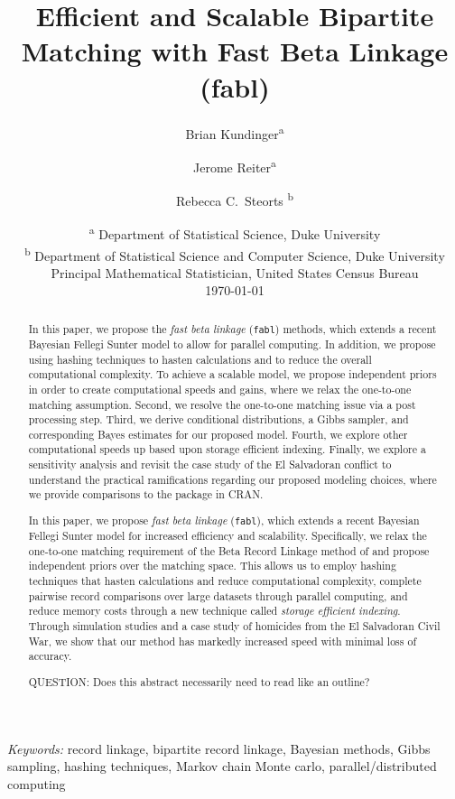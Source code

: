 \documentclass[12pt,letterpaper]{article}
\title{Efficient and Scalable Bipartite Matching with Fast Beta Linkage  (fabl)}
\author{Brian Kundinger\textsuperscript{a} \and
  Jerome Reiter\textsuperscript{a} \and 
  Rebecca C.~Steorts \textsuperscript{b}}
\date{
 \textsuperscript{a} Department of Statistical Science, Duke University \\
 \textsuperscript{b} Department of Statistical Science and Computer Science, Duke University\\Principal Mathematical Statistician, United States Census Bureau\\[2ex]
  \today}
\newcommand{\1}[1]{\mathbb{I}\!\left[#1\right]} %
\begin{document}
\maketitle

\bigskip
\begin{abstract}
In this paper, we propose the \emph{fast beta linkage} (\texttt{fabl}) methods, which extends a recent Bayesian Fellegi Sunter model to allow for parallel computing. In addition, we propose using hashing techniques to hasten calculations and to reduce the overall computational complexity. To achieve a scalable model, we propose independent priors in order to create computational speeds and gains, where we relax the one-to-one matching assumption. Second, we resolve the one-to-one matching issue via a post processing step. Third, we derive conditional distributions, a Gibbs sampler, and corresponding Bayes estimates for our proposed model. Fourth, we explore other computational speeds up based upon storage efficient indexing. Finally, we explore a sensitivity analysis and revisit the case study of the El Salvadoran conflict to understand the practical ramifications regarding our proposed modeling choices, where we provide comparisons to the  package in CRAN. 

\vspace{1ex}
{
\color{blue}
In this paper, we propose \emph{fast beta linkage} (\texttt{fabl}), which extends a recent Bayesian Fellegi Sunter model for increased efficiency and scalability. Specifically, we relax the one-to-one matching requirement of the Beta Record Linkage method of \citep{sadinle_bayesian_2017} and propose independent priors over the matching space. This allows us to employ hashing techniques that hasten calculations and reduce computational complexity, complete pairwise record comparisons over large datasets through parallel computing, and reduce memory costs through a new technique called \emph{storage efficient indexing}. Through simulation studies and a case study of homicides from the El Salvadoran Civil War, we show that our method has markedly increased speed with minimal loss of accuracy.

\vspace{1ex}
QUESTION: Does this abstract necessarily need to read like an outline?
}
\end{abstract}


\noindent%
{\it Keywords:} record linkage, bipartite record linkage, Bayesian methods, Gibbs sampling, hashing techniques, Markov chain Monte carlo, parallel/distributed computing
\end{document}
